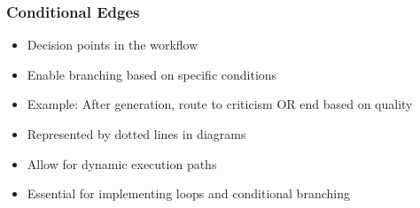 % 
% 
% 
% 
% 
%  
%   
% 
\begin{frame}[fragile]\frametitle{Conditional Edges}
      \begin{itemize}
        \item Decision points in the workflow
        \item Enable branching based on specific conditions
        \item Example: After generation, route to criticism OR end based on quality
        \item Represented by dotted lines in diagrams
        \item Allow for dynamic execution paths
        \item Essential for implementing loops and conditional branching
      \end{itemize}
\end{frame}
